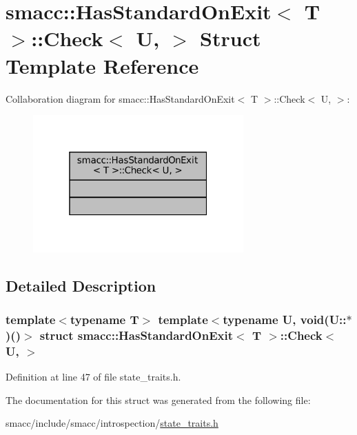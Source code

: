 \hypertarget{structsmacc_1_1HasStandardOnExit_1_1Check}{}\section{smacc\+:\+:Has\+Standard\+On\+Exit$<$ T $>$\+:\+:Check$<$ U, $>$ Struct Template Reference}
\label{structsmacc_1_1HasStandardOnExit_1_1Check}


Collaboration diagram for smacc\+:\+:Has\+Standard\+On\+Exit$<$ T $>$\+:\+:Check$<$ U, $>$\+:
\nopagebreak
\begin{figure}[H]
\begin{center}
\leavevmode
\includegraphics[width=229pt]{structsmacc_1_1HasStandardOnExit_1_1Check__coll__graph}
\end{center}
\end{figure}


\subsection{Detailed Description}
\subsubsection*{template$<$typename T$>$\newline
template$<$typename U, void(\+U\+::$\ast$)()$>$\newline
struct smacc\+::\+Has\+Standard\+On\+Exit$<$ T $>$\+::\+Check$<$ U, $>$}



Definition at line 47 of file state\+\_\+traits.\+h.



The documentation for this struct was generated from the following file\+:\begin{DoxyCompactItemize}
\item 
smacc/include/smacc/introspection/\hyperlink{state__traits_8h}{state\+\_\+traits.\+h}\end{DoxyCompactItemize}
